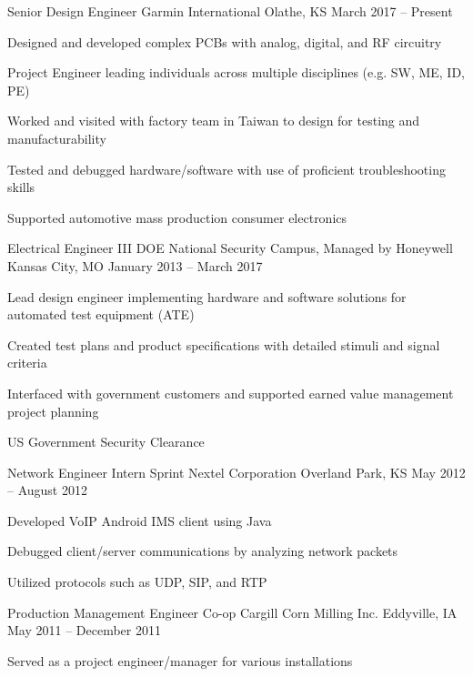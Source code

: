 \documentclass[]{awesome-cv}
\begin{document}
\vspace{-2mm}
\begin{cventries}
	\cventry
	{Senior Design Engineer}
	{Garmin International}
	{Olathe, KS}
	{March 2017 – Present}
	{\begin{cvitems}
		\item {Designed and developed complex PCBs with analog, digital, and RF circuitry}
		\item {Project Engineer leading individuals across multiple disciplines (e.g. SW, ME, ID, PE)}
		\item {Worked and visited with factory team in Taiwan to design for testing and manufacturability}
		\item {Tested and debugged hardware/software with use of proficient troubleshooting skills}
		\item {Supported automotive mass production consumer electronics}
		\end{cvitems}}
	\cventry
	{Electrical Engineer III}
	{DOE National Security Campus, Managed by Honeywell}
	{Kansas City, MO}
	{January 2013 – March 2017}
	{\begin{cvitems}
		\item {Lead design engineer implementing hardware and software solutions for automated test equipment (ATE)}
		\item {Created test plans and product specifications with detailed stimuli and signal criteria}
		\item {Interfaced with government customers and supported earned value management project planning}
		\item {US Government Security Clearance}
		\end{cvitems}}
	\cventry
	{Network Engineer Intern}
	{Sprint Nextel Corporation}
	{Overland Park, KS}
	{May 2012 – August 2012}
	{\begin{cvitems}
		\item {Developed VoIP Android IMS client using Java}
		\item {Debugged client/server communications by analyzing network packets}
		\item {Utilized protocols such as UDP, SIP, and RTP}
		\end{cvitems}}
	\cventry
	{Production Management Engineer Co-op}
	{Cargill Corn Milling Inc.}
	{Eddyville, IA}
	{May 2011 – December 2011}
	{\begin{cvitems}
		\item {Served as a project engineer/manager for various installations}

\end{cvitems}}
\end{cventries}
\end{document}
